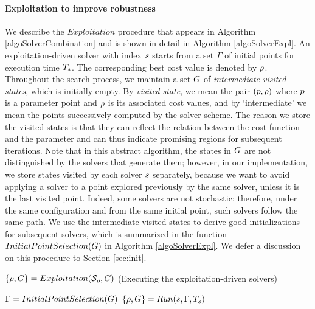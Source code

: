 \paragraph{Exploitation to improve robustness}

We describe the $Exploitation$ procedure that appears in Algorithm \ref{algoSolverCombination} and is shown in detail in Algorithm \ref{algoSolverExpl}. 
An exploitation-driven solver with index $s$ starts from a set $\Gamma$ of initial points for execution time $T_{s}$. The corresponding best cost value is denoted by $\rho$. Throughout the search process, we maintain a set $G$ of {\em intermediate visited states}, which is initially empty. By {\em visited state}, we mean the pair $(p, \rho)$ where $p$ is a parameter point and $\rho$ is its associated cost values, and by `intermediate' we mean the points successively computed by the solver scheme. The reason we store the visited states is that they can reflect the relation between the cost function and the parameter and can thus indicate promising regions for subsequent iterations. Note that in this abstract algorithm, the states in $G$ are not distinguished by the solvers that generate them; however, in our implementation, we store states visited by each solver $s$ separately, because we want to avoid applying a solver to a point explored previously by the same solver, unless it is the last visited point. Indeed, some solvers are not stochastic; therefore, under the same configuration and from the same initial point, such solvers follow the same path. We use the intermediate visited states to derive good initializations for subsequent solvers, which is summarized in the function $InitialPointSelection(G)$ in Algorithm \ref{algoSolverExpl}. We defer a discussion on this procedure to Section \ref{sec:init}.

\begin{algorithm}
\caption{$\{ \rho, G \}=Exploitation(\mathcal{S_{\rho}}, G)$ 
(Executing the exploitation-driven solvers) \label{algoSolverExpl}}
\begin{algorithmic}
		\State {}
		\ForAll{$\solver \in \solversetRho$} 
		\State $\Gamma = InitialPointSelection(G)$
		\State {}
  		\State $\{ \rho, G \} = Run(s, \Gamma, T_{s})$ 
		\EndFor
\end{algorithmic}
\end{algorithm}


